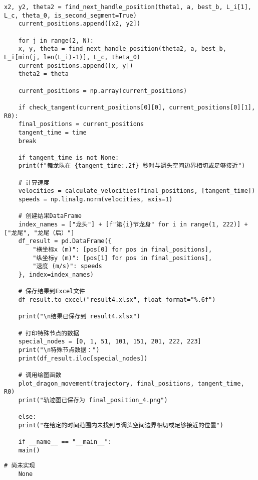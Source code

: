 \begin{lstlisting}[caption={问题四处理代码}]
	x2, y2, theta2 = find_next_handle_position(theta1, a, best_b, L_i[1], L_c, theta_0, is_second_segment=True)
	current_positions.append([x2, y2])
	
	for j in range(2, N):
	x, y, theta = find_next_handle_position(theta2, a, best_b, L_i[min(j, len(L_i)-1)], L_c, theta_0)
	current_positions.append([x, y])
	theta2 = theta
	
	current_positions = np.array(current_positions)
	
	if check_tangent(current_positions[0][0], current_positions[0][1], R0):
	final_positions = current_positions
	tangent_time = time
	break
	
	if tangent_time is not None:
	print(f"舞龙队在 {tangent_time:.2f} 秒时与调头空间边界相切或足够接近")
	
	# 计算速度
	velocities = calculate_velocities(final_positions, [tangent_time])
	speeds = np.linalg.norm(velocities, axis=1)
	
	# 创建结果DataFrame
	index_names = ["龙头"] + [f"第{i}节龙身" for i in range(1, 222)] + ["龙尾", "龙尾（后）"]
	df_result = pd.DataFrame({
		"横坐标x (m)": [pos[0] for pos in final_positions],
		"纵坐标y (m)": [pos[1] for pos in final_positions],
		"速度 (m/s)": speeds
	}, index=index_names)
	
	# 保存结果到Excel文件
	df_result.to_excel("result4.xlsx", float_format="%.6f")
	
	print("\n结果已保存到 result4.xlsx")
	
	# 打印特殊节点的数据
	special_nodes = [0, 1, 51, 101, 151, 201, 222, 223]
	print("\n特殊节点数据：")
	print(df_result.iloc[special_nodes])
	
	# 调用绘图函数
	plot_dragon_movement(trajectory, final_positions, tangent_time, R0)
	print("轨迹图已保存为 final_position_4.png")
	
	else:
	print("在给定的时间范围内未找到与调头空间边界相切或足够接近的位置")
	
	if __name__ == "__main__":
	main()

\end{lstlisting}

\begin{lstlisting}[caption={问题五处理代码}]
	# 尚未实现
	None
	
\end{lstlisting}